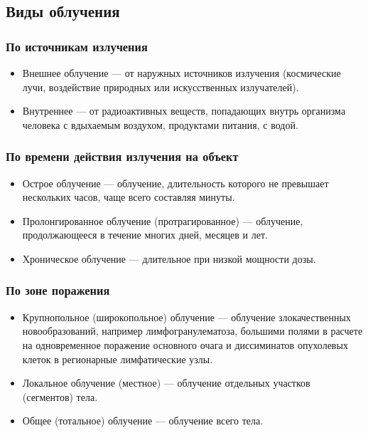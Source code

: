 \documentclass[a4paper, 14pt]{extarticle}
\begin{document}
\subsection{Виды облучения}
\subsubsection*{По источникам излучения}

\begin{itemize}
    \item Внешнее облучение — от наружных источников излучения (космические лучи, воздействие природных или искусственных излучателей).
    \item Внутреннее — от радиоактивных веществ, попадающих внутрь организма человека с вдыхаемым воздухом, продуктами питания, с водой.
\end{itemize}

\subsubsection*{По времени действия излучения на объект}

\begin{itemize}
    \item Острое облучение — облучение, длительность которого не превышает нескольких часов, чаще всего составляя минуты.
    \item Пролонгированное облучение (протрагированное) — облучение, продолжающееся в течение многих дней, месяцев и лет.
    \item Хроническое облучение — длительное при низкой мощности дозы.
\end{itemize}

\subsubsection*{По зоне поражения}

\begin{itemize}
    \item Крупнопольное (широкопольное) облучение — облучение злокачественных новообразований, например лимфогранулематоза, большими полями в расчете на одновременное поражение основного очага и диссиминатов опухолевых клеток в регионарные лимфатические узлы.
    \item Локальное облучение (местное) — облучение отдельных участков (сегментов) тела.
    \item Общее (тотальное) облучение — облучение всего тела.
\end{itemize}
\end{document}
